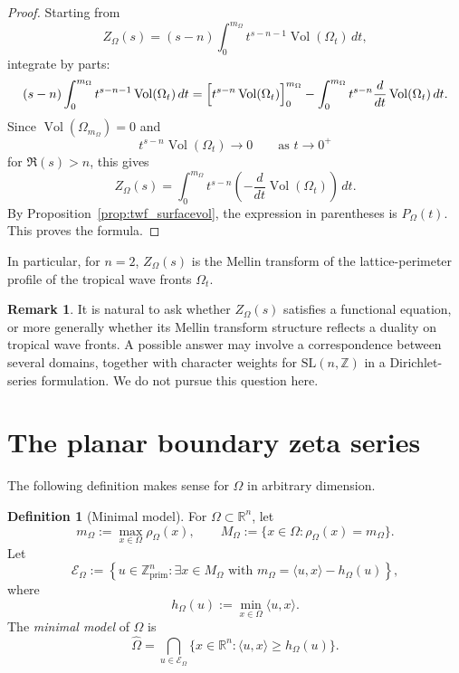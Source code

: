 \documentclass[a4paper,american,11pt]{amsart}
\theoremstyle{plain}
\theoremstyle{definition}
\newtheorem{definition}[theorem]{Definition}
\newtheorem{remark}[theorem]{Remark}
\newcommand{\Z}{\mathbb Z}
\newcommand{\R}{\mathbb R}
\begin{document}
\begin{proof}
Starting from
\[
Z_\Omega(s)
=
(s-n)\int_0^{m_\Omega} t^{s-n-1}\operatorname{Vol}(\Omega_t)\,dt,
\]
integrate by parts:
\[
(s-n)\int_0^{m_\Omega} t^{s-n-1}\operatorname{Vol}(\Omega_t)\,dt
=
\Bigl[t^{s-n}\operatorname{Vol}(\Omega_t)\Bigr]_0^{m_\Omega}
-
\int_0^{m_\Omega} t^{s-n}
\frac{d}{dt}\operatorname{Vol}(\Omega_t)\,dt.
\]
Since \(\operatorname{Vol}(\Omega_{m_\Omega})=0\) and
\[
t^{s-n}\operatorname{Vol}(\Omega_t)\to 0
\qquad\text{as }t\to0^+
\]
for \(\Re(s)>n\), this gives
\[
Z_\Omega(s)
=
\int_0^{m_\Omega} t^{s-n}
\left(-\frac{d}{dt}\operatorname{Vol}(\Omega_t)\right)\,dt.
\]
By Proposition~\ref{prop:twf_surfacevol}, the expression in parentheses is
\(P_\Omega(t)\). This proves the formula.
\end{proof}

In particular, for \(n=2\), \(Z_\Omega(s)\) is the Mellin transform of the
lattice-perimeter profile of the tropical wave fronts \(\Omega_t\).

\begin{remark}
It is natural to ask whether \(Z_\Omega(s)\) satisfies a functional equation,
or more generally whether its Mellin transform structure reflects a duality on
tropical wave fronts. A possible answer may involve a correspondence between
several domains, together with character weights for \(\mathrm{SL}(n,\Z)\) in
a Dirichlet-series formulation. We do not pursue this question here.
\end{remark}

\section{The planar boundary zeta series}\label{sec2}

The following definition makes sense for \(\Omega\) in arbitrary dimension.

\begin{definition}[Minimal model]\label{def:minimalmodel}
For \(\Omega\subset\R^n\), let
\[
m_\Omega:=\max_{x\in \Omega}\rho_\Omega(x),
\qquad
M_\Omega:=\{x\in\Omega:\rho_\Omega(x)=m_\Omega\}.
\]
Let
\[
\mathcal E_\Omega
:=
\left\{
u\in\Z^n_{\mathrm{prim}}:
\exists x\in M_\Omega
\text{ with }
m_\Omega=\langle u,x\rangle-h_\Omega(u)
\right\},
\]
where
\[
h_\Omega(u):=\min_{x\in \Omega}\langle u,x\rangle.
\]
The \emph{minimal model} of \(\Omega\) is
\[
\widehat\Omega
=
\bigcap_{u\in\mathcal E_\Omega}
\{x\in\R^n:\langle u,x\rangle\ge h_\Omega(u)\}.
\]
\end{definition}
\end{document}
